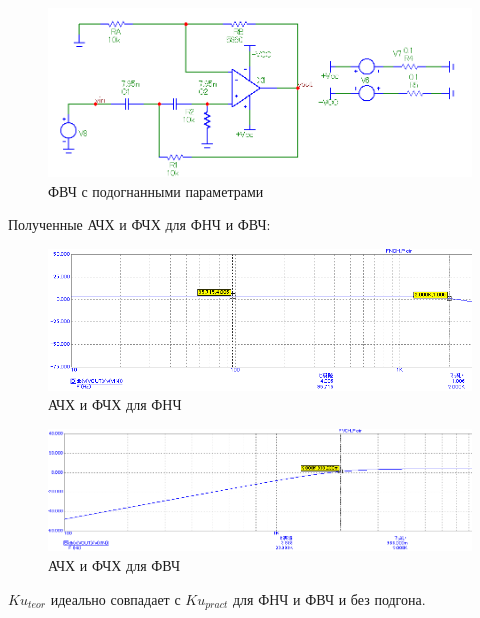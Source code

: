\documentclass[a4paper,14pt]{article}
\begin{document}
\begin{figure}[H]
	\centering
	\includegraphics[width=0.85\linewidth]{../imgs/FVCH/sh_fvch_p}
	\caption{ФВЧ с подогнанными параметрами}
	\label{fig:shfvchp}
\end{figure}

Полученные АЧХ и ФЧХ для ФНЧ и ФВЧ:

\begin{figure}[H]
	\centering
	\includegraphics[width=0.85\linewidth]{../imgs/FNCH/gr_fnch_p1}
	\caption{АЧХ и ФЧХ для ФНЧ}
	\label{fig:grfnchp1}
\end{figure}


\begin{figure}[H]
	\centering
	\includegraphics[width=0.85\linewidth]{../imgs/FVCH/gr_fvch_p1}
	\caption{АЧХ и ФЧХ для ФВЧ}
	\label{fig:grfvchp1}
\end{figure}

$Ku_{teor}$ идеально совпадает с $Ku_{pract}$ для ФНЧ и ФВЧ и без подгона.
\end{document}
